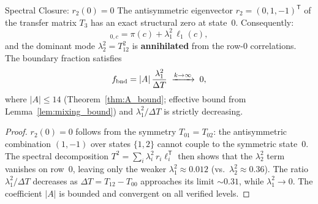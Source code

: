 \documentclass[12pt,a4paper]{article}
\begin{document}
\begin{thmbox}{Spectral Closure: $r_2(0) = 0$}
\label{thm:spectral_closure}
The antisymmetric eigenvector $r_2 = (0, 1, -1)^{\mathsf{T}}$ of the
transfer matrix $T_3$ has an exact structural zero at state~$0$.
Consequently:
\begin{equation}
  [T^2]_{0,c} = \pi(c) + \lambda_1^2\,\ell_1(c),
  \label{eq:T2_annihilation}
\end{equation}
and the dominant mode $\lambda_2^2 = T_{12}^2$ is \textbf{annihilated}
from the row-$0$ correlations. The boundary fraction satisfies
\begin{equation}
  f_{\rm bnd} = |A|\,\frac{\lambda_1^2}{\Delta T}
  \;\xrightarrow{k\to\infty}\; 0,
  \label{eq:f_bnd}
\end{equation}
where $|A| \leq 14$ (Theorem~\ref{thm:A_bound}; effective bound
from Lemma~\ref{lem:mixing_bound})
and $\lambda_1^2/\Delta T$ is strictly decreasing.

\begin{proof}
$r_2(0) = 0$ follows from the symmetry $T_{01} = T_{02}$: the
antisymmetric combination $(1,-1)$ over states $\{1,2\}$ cannot
couple to the symmetric state~$0$. The spectral decomposition
$T^2 = \sum_i \lambda_i^2\,r_i \ell_i^{\mathsf{T}}$ then shows
that the $\lambda_2^2$ term vanishes on row~$0$, leaving only the
weaker $\lambda_1^2 \approx 0.012$ (vs.\ $\lambda_2^2 \approx 0.36$).
The ratio $\lambda_1^2/\Delta T$ decreases as $\Delta T =
T_{12} - T_{00}$ approaches its limit $\sim 0.31$, while $\lambda_1^2
\to 0$. The coefficient $|A|$ is bounded and convergent on all
verified levels.
\end{proof}
\end{thmbox}
\end{document}
